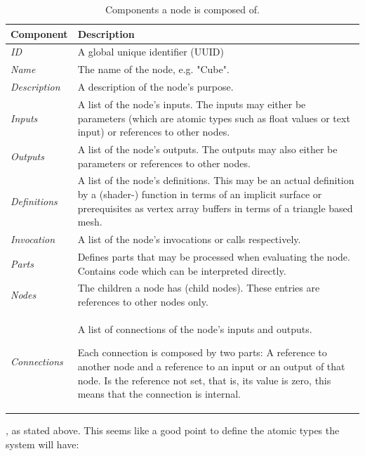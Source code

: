 \documentclass[%
    a4paper,    %
    justified,  %
    nobib,      %
    openany     %
]{tufte-book}
\newcommand{\ra}[1]{\renewcommand{\arraystretch}{#1}}
\begin{document}
\begin{table}\centering
  \ra{1.3}
  \begin{tabularx}{\textwidth}{@{}lX@{}}
    \toprule
    \textbf{Component} & \textbf{Description}\\
    \hline
    \textit{ID} & A global unique identifier (UUID\protect\footnotemark[1]{})\\
    \textit{Name} & The name of the node, e.g. "Cube".\\
    \textit{Description} & A description of the node's purpose.\\
    \textit{Inputs} & A list of the node's inputs. The inputs may either be
    parameters (which are atomic types such as float values or text input) or
    references to other nodes.\\
    \textit{Outputs} & A list of the node's outputs. The outputs may also either
    be parameters or references to other nodes.\\
    \textit{Definitions} & A list of the node's definitions. This may be an
    actual definition by a (shader-) function in terms of an implicit surface or
    prerequisites as vertex array buffers in terms of a triangle based mesh.\\
    \textit{Invocation} & A list of the node's invocations or calls
    respectively.\\
    \textit{Parts} & Defines parts that may be processed when evaluating the
    node. Contains code which can be interpreted directly.\\
    \textit{Nodes} & The children a node has (child nodes). These entries are
    references to other nodes only.\\
    \textit{Connections} & A list of connections of the node's inputs and
    outputs.

    Each connection is composed by two parts: A reference to another node
    and a reference to an input or an output of that node. Is the reference not set,
    that is, its value is zero, this means that the connection is internal.\\
    \bottomrule
  \end{tabularx}
  \caption{Components a node is composed of.}
\end{table}

, as
stated above. This seems like a good point to define the atomic types the system
will have:
\end{document}
